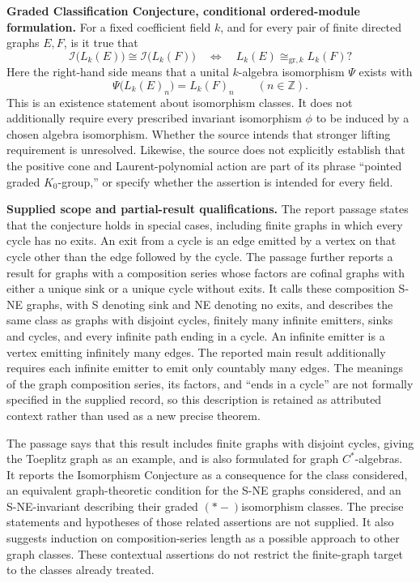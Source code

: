 \documentclass[11pt]{article}
\newcommand{\Z}{\mathbb{Z}}
\begin{document}
\textbf{Graded Classification Conjecture, conditional ordered-module formulation.} For a fixed coefficient field \(k\), and for every pair of finite directed graphs \(E,F\), is it true that
\[
\mathcal I\bigl(L_k(E)\bigr)\cong\mathcal I\bigl(L_k(F)\bigr)
\quad\Longleftrightarrow\quad
L_k(E)\cong_{\mathrm{gr},k}L_k(F)?
\]
Here the right-hand side means that a unital \(k\)-algebra isomorphism \(\Psi\) exists with
\[
\Psi\bigl(L_k(E)_n\bigr)=L_k(F)_n\qquad(n\in\Z).
\]
This is an existence statement about isomorphism classes. It does not additionally require every prescribed invariant isomorphism \(\phi\) to be induced by a chosen algebra isomorphism. Whether the source intends that stronger lifting requirement is unresolved. Likewise, the source does not explicitly establish that the positive cone and Laurent-polynomial action are part of its phrase ``pointed graded \(K_0\)-group,'' or specify whether the assertion is intended for every field.

\textbf{Supplied scope and partial-result qualifications.} The report passage states that the conjecture holds in special cases, including finite graphs in which every cycle has no exits. An exit from a cycle is an edge emitted by a vertex on that cycle other than the edge followed by the cycle. The passage further reports a result for graphs with a composition series whose factors are cofinal graphs with either a unique sink or a unique cycle without exits. It calls these composition S-NE graphs, with S denoting sink and NE denoting no exits, and describes the same class as graphs with disjoint cycles, finitely many infinite emitters, sinks and cycles, and every infinite path ending in a cycle. An infinite emitter is a vertex emitting infinitely many edges. The reported main result additionally requires each infinite emitter to emit only countably many edges. The meanings of the graph composition series, its factors, and ``ends in a cycle'' are not formally specified in the supplied record, so this description is retained as attributed context rather than used as a new precise theorem.

The passage says that this result includes finite graphs with disjoint cycles, giving the Toeplitz graph as an example, and is also formulated for graph \(C^*\)-algebras. It reports the Isomorphism Conjecture as a consequence for the class considered, an equivalent graph-theoretic condition for the S-NE graphs considered, and an S-NE-invariant describing their graded \((*\!-)\)isomorphism classes. The precise statements and hypotheses of those related assertions are not supplied. It also suggests induction on composition-series length as a possible approach to other graph classes. These contextual assertions do not restrict the finite-graph target to the classes already treated.
\end{document}
